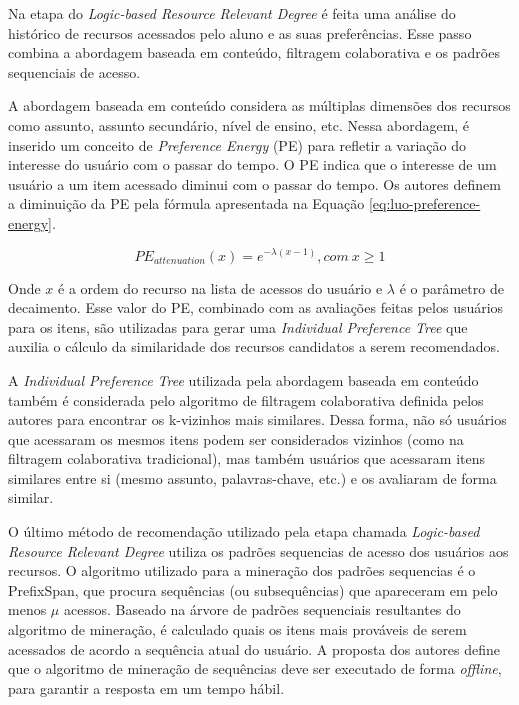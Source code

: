 Na etapa do \textit{Logic-based Resource Relevant Degree} é feita uma análise do histórico de recursos acessados pelo aluno e as
suas preferências. Esse passo combina a abordagem baseada em conteúdo, filtragem colaborativa e os padrões sequenciais
de acesso.

A abordagem baseada em conteúdo considera as múltiplas dimensões dos recursos como assunto, assunto secundário, nível
de ensino, etc. Nessa abordagem, é inserido um conceito de \textit{Preference Energy} (PE) para refletir a variação do interesse
do usuário com o passar do tempo. O PE indica que o interesse de um usuário a um item acessado diminui com o passar do
tempo. Os autores definem a diminuição da PE pela fórmula apresentada na Equação \ref{eq:luo-preference-energy}.

\begin{equation}
  \label{eq:luo-preference-energy}
  PE_{attenuation}(x) = e^{- \lambda (x-1)}, com \ x \geqslant 1
\end{equation}

Onde $x$ é a ordem do recurso na lista de acessos do usuário e $\lambda$ é o parâmetro de decaimento. Esse valor do PE,
combinado com as avaliações feitas pelos usuários para os itens, são utilizadas para gerar uma \textit{Individual Preference Tree}
que auxilia o cálculo da similaridade dos recursos candidatos a serem recomendados.

A \textit{Individual Preference Tree} utilizada pela abordagem baseada em conteúdo também é considerada pelo algoritmo de
filtragem colaborativa definida pelos autores para encontrar os k-vizinhos mais similares. Dessa forma, não só usuários
que acessaram os mesmos itens podem ser considerados vizinhos (como na filtragem colaborativa tradicional), mas também
usuários que acessaram itens similares entre si (mesmo assunto, palavras-chave, etc.) e os avaliaram de forma similar.

O último método de recomendação utilizado pela etapa chamada \textit{Logic-based Resource Relevant Degree} utiliza os padrões
sequencias de acesso dos usuários aos recursos. O algoritmo utilizado para a mineração dos padrões sequencias é o
PrefixSpan, que procura sequências (ou subsequências) que apareceram em pelo menos $\mu$ acessos. Baseado na árvore de
padrões sequenciais resultantes do algoritmo de mineração, é calculado quais os itens mais prováveis de serem acessados
de acordo a sequência atual do usuário. A proposta dos autores define que o algoritmo de mineração de sequências deve
ser executado de forma \textit{offline}, para garantir a resposta em um tempo hábil.

